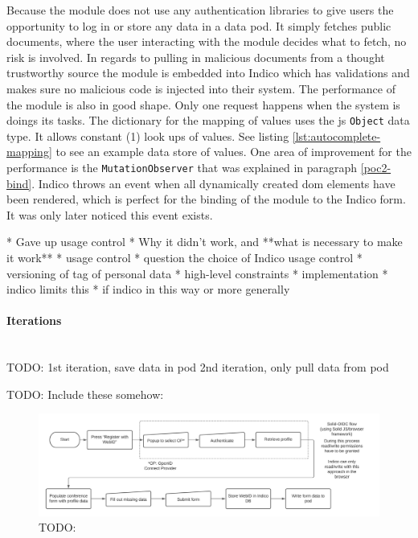 Because the module does not use any authentication libraries to give users the opportunity to log in or store any data in a data pod. It simply fetches public documents, where the user interacting with the module decides what to fetch, no risk is involved. In regards to pulling in malicious documents from a thought trustworthy source the module is embedded into Indico which has validations and makes sure no malicious code is injected into their system.
The performance of the module is also in good shape. Only one request happens when the system is doings its tasks. The dictionary for the mapping of values uses the \gls{js} \texttt{Object} data type. It allows constant \bigO(1) look ups of values. See listing \ref{lst:autocomplete-mapping} to see an example data store of values. One area of improvement for the performance is the \texttt{MutationObserver} that was explained in paragraph \ref{poc2-bind}. Indico throws an event when all dynamically created \gls{dom} elements have been rendered, which is perfect for the binding of the module to the Indico form. It was only later noticed this event exists.

\vspace{0.5cm}



* Gave up usage control
  * Why it didn't work, and **what is necessary to make it work**
    * usage control
    * question the choice of Indico usage control
    * versioning of tag of personal data
* high-level constraints
* implementation
  * indico limits this
* if indico in this way or more generally

\vspace{0.5cm}
\paragraph{Iterations}\mbox{}\\
TODO:
1st iteration, save data in pod
2nd iteration, only pull data from pod

TODO: Include these somehow:

\begin{figure}
    \centering
    \includegraphics[width=1\textwidth]{prototype/graphs/poc-conference_registration_flow-client_side-sideways.jpeg}
    \caption{TODO:}
    \label{fig:poc-conference_registration_flow-client_side-sideways}
\end{figure}

